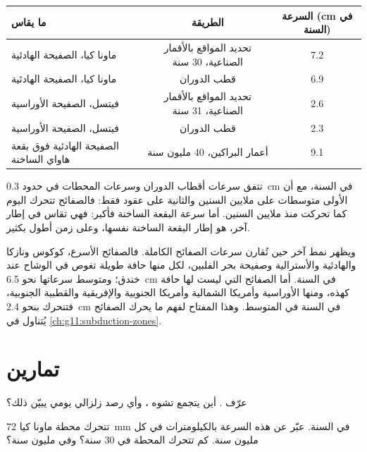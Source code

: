 \begin{center}
\small
\begin{tabular}{|l|c|c|}
\hline
ما يقاس & الطريقة & السرعة (\unit{cm} في السنة) \\ \hline
ماونا كيا، الصفيحة الهادئية & تحديد المواقع بالأقمار الصناعية، 30 سنة & 7.2 \\
ماونا كيا، الصفيحة الهادئية & قطب الدوران & 6.9 \\
فيتسل، الصفيحة الأوراسية & تحديد المواقع بالأقمار الصناعية، 31 سنة & 2.6 \\
فيتسل، الصفيحة الأوراسية & قطب الدوران & 2.3 \\
الصفيحة الهادئية فوق بقعة هاواي الساخنة & أعمار البراكين، 40 مليون سنة & 9.1 \\ \hline
\end{tabular}
\end{center}

تتفق سرعات أقطاب الدوران وسرعات المحطات في حدود
\qty{0.3}{cm} في السنة، مع أن الأولى متوسطات على ملايين السنين
والثانية على عقود فقط: فالصفائح تتحرك اليوم كما تحركت منذ ملايين
السنين. أما سرعة البقعة الساخنة فأكبر: فهي تقاس في إطار آخر، هو إطار
البقعة الساخنة نفسها، وعلى زمن أطول بكثير.

ويظهر نمط آخر حين تُقارن سرعات الصفائح الكاملة. فالصفائح
الأسرع، كوكوس ونازكا والهادئية والأسترالية وصفيحة بحر
الفلبين، لكل منها حافة طويلة تغوص في الوشاح عند خندق؛ ومتوسط
سرعاتها نحو \qty{6.5}{cm} في السنة. أما الصفائح التي ليست لها
حافة كهذه، ومنها الأوراسية وأمريكا الشمالية وأمريكا الجنوبية والإفريقية
والقطبية الجنوبية، فتتحرك بنحو \qty{2.4}{cm} في السنة في المتوسط. وهذا المفتاح لفهم
ما يحرك الصفائح يُتناول في \cref{ch:g11:subduction-zones}.

\section{تمارين}

\begin{exercise}[$\star$]\label{exo:g11:plate-motions:1}
عرّف . أين يتجمع تشوه ،
وأي رصد زلزالي يومي يبيّن ذلك؟
\end{exercise}

\begin{exercise}[$\star$]\label{exo:g11:plate-motions:2}
تتحرك محطة ماونا كيا \qty{72}{mm} في السنة. عبّر عن هذه السرعة
بالكيلومترات في كل مليون سنة. كم تتحرك المحطة في 30 سنة؟ وفي
مليون سنة؟
\end{exercise}

